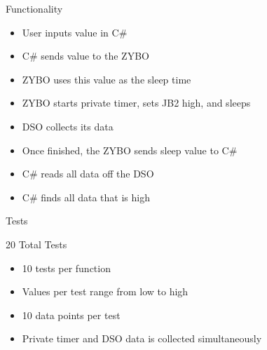 \documentclass[pdf]{beamer}
\begin{document}
\begin{frame}{Functionality}

  \begin{itemize}
  \item User inputs value in C\#
  \item C\# sends value to the ZYBO
  \end{itemize}
  
  \pause

  \begin{itemize}
  \item ZYBO uses this value as the sleep time
  \item ZYBO starts private timer, sets JB2 high, and sleeps
  \item DSO collects its data
  \end{itemize}
  
  \pause
  
  \begin{itemize}
  \item Once finished, the ZYBO sends sleep value to C\#
  \item C\# reads all data off the DSO
  \item C\# finds all data that is high
  \end{itemize}

\end{frame}

\begin{frame}{Tests}

  20 Total Tests
  \begin{itemize}
  \item 10 tests per function
  \item Values per test range from low to high
  \item 10 data points per test
  \item Private timer and DSO data is collected simultaneously
  \end{itemize}
    
\end{frame}
\end{document}
